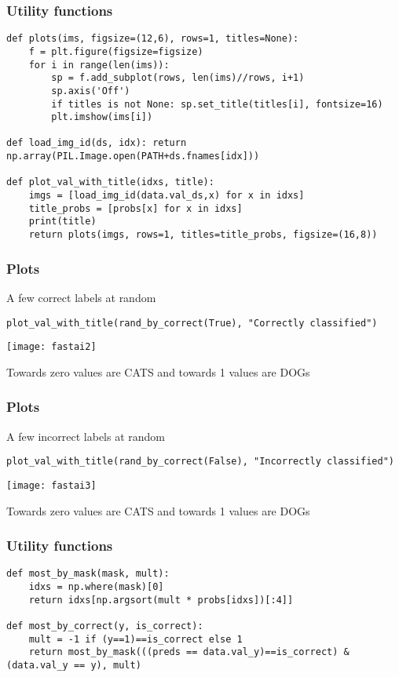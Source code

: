 \begin{frame}[fragile] \frametitle{Utility functions}

\begin{lstlisting}
def plots(ims, figsize=(12,6), rows=1, titles=None):
    f = plt.figure(figsize=figsize)
    for i in range(len(ims)):
        sp = f.add_subplot(rows, len(ims)//rows, i+1)
        sp.axis('Off')
        if titles is not None: sp.set_title(titles[i], fontsize=16)
        plt.imshow(ims[i])
        
def load_img_id(ds, idx): return np.array(PIL.Image.open(PATH+ds.fnames[idx]))

def plot_val_with_title(idxs, title):
    imgs = [load_img_id(data.val_ds,x) for x in idxs]
    title_probs = [probs[x] for x in idxs]
    print(title)
    return plots(imgs, rows=1, titles=title_probs, figsize=(16,8))        
\end{lstlisting}

\end{frame}

\begin{frame}[fragile] \frametitle{Plots}
A few correct labels at random
\begin{lstlisting}
plot_val_with_title(rand_by_correct(True), "Correctly classified")
\end{lstlisting}
\begin{center}
\texttt{[image: fastai2]}
\end{center}
Towards zero values are CATS and towards 1 values are DOGs
\end{frame}

\begin{frame}[fragile] \frametitle{Plots}
A few incorrect labels at random
\begin{lstlisting}
plot_val_with_title(rand_by_correct(False), "Incorrectly classified")
\end{lstlisting}
\begin{center}
\texttt{[image: fastai3]}
\end{center}
Towards zero values are CATS and towards 1 values are DOGs
\end{frame}

\begin{frame}[fragile] \frametitle{Utility functions}

\begin{lstlisting}
def most_by_mask(mask, mult):
    idxs = np.where(mask)[0]
    return idxs[np.argsort(mult * probs[idxs])[:4]]

def most_by_correct(y, is_correct): 
    mult = -1 if (y==1)==is_correct else 1
    return most_by_mask(((preds == data.val_y)==is_correct) & (data.val_y == y), mult)
\end{lstlisting}

\end{frame}



